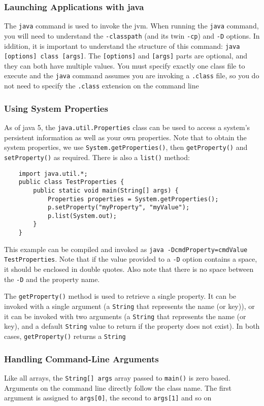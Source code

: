 \subsubsection{Launching Applications with java}
The \verb#java# command is used to invoke the jvm. When running the \verb#java# 
command, you will need to understand the \verb#-classpath# (and its twin 
\verb#-cp#) and \verb#-D# options. In iddition, it is important to understand 
the structure of this command: \verb#java [options] class [args]#. The 
\verb#[options]# and \verb#[args]# parts are optional, and they can both have 
multiple values. You must specify exactly one class file to execute and the 
\verb#java# command assumes you are invoking a \verb#.class# file, so you do 
not need to specify the \verb#.class# extension on the command line

\subsubsection{Using System Properties}
As of java 5, the \verb#java.util.Properties# class can be used to access a 
system's persistent information as well as your own properties. Note that to 
obtain the system properties, we use \verb#System.getProperties()#, then 
\verb#getProperty()# and \verb#setProperty()# as required. There is also a 
\verb#list()# method:
\begin{verbatim}
    import java.util.*;
    public class TestProperties {
        public static void main(String[] args) {
            Properties properties = System.getProperties();
            p.setProperty("myProperty", "myValue");
            p.list(System.out);
        }
    }
\end{verbatim}
This example can be compiled and invoked as \verb#java -DcmdProperty=cmdValue TestProperties#. Note that if the value provided to a \verb#-D# option contains 
a space, it should be enclosed in double quotes. Also note that there is no 
space between the \verb#-D# and the property name.

The \verb#getProperty()# method is used to retrieve a single property. It can 
be invoked with a single argument (a \verb#String# that represents the name (or 
key)), or it can be invoked with two arguments (a \verb#String# that represents 
the name (or key), and a default \verb#String# value to return if the property 
does not exist). In both cases, \verb#getProperty()# returns a \verb#String#

\subsubsection{Handling Command-Line Arguments}
Like all arrays, the \verb#String[] args# array passed to \verb#main()# is zero 
based. Arguments on the command line directly follow the class name. The first 
argument is assigned to \verb#args[0]#, the second to \verb#args[1]# and so on

